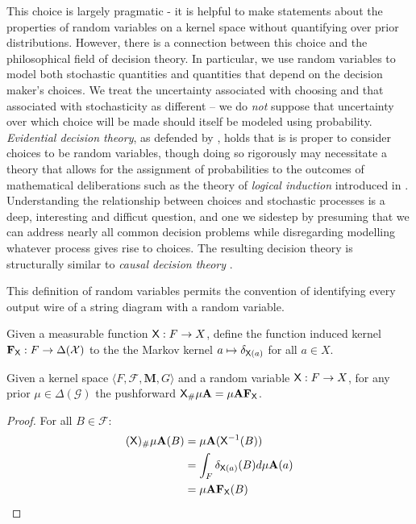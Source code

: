 This choice is largely pragmatic - it is helpful to make statements about the properties of random variables on a kernel space without quantifying over prior distributions. However, there is a connection between this choice and the philosophical field of decision theory. In particular, we use random variables to model both stochastic quantities and quantities that depend on the decision maker's choices. We treat the uncertainty associated with choosing and that associated with stochasticity as different -- we do \emph{not} suppose that uncertainty over which choice will be made should itself be modeled using probability. \emph{Evidential decision theory}, as defended by \citet{jeffrey_logic_1981}, holds that is is proper to consider choices to be random variables, though doing so rigorously may necessitate a theory that allows for the assignment of probabilities to the outcomes of mathematical deliberations such as the theory of \emph{logical induction} introduced in \citet{garrabrant_logical_2017}. Understanding the relationship between choices and stochastic processes is a deep, interesting and difficut question, and one we sidestep by presuming that we can address nearly all common decision problems while disregarding modelling whatever process gives rise to choices. The resulting decision theory is structurally similar to \emph{causal decision theory} \citep{lewis_causal_1981}.

This definition of random variables permits the convention of identifying every output wire of a string diagram with a random variable. 

\begin{definition}
Given a measurable function $\mathsf{X}:F\to X$, define the function induced kernel $\mathbf{F}_{\mathsf{X}}:F\to \Delta(\mathcal{X})$ to the the Markov kernel $a\mapsto \delta_{\mathsf{X}(a)}$ for all $a\in X$.
\end{definition}

\begin{lemma}\label{lem:pushf_funk}
Given a kernel space $\langle F,\mathcal{F},\mathbf{M}, G\rangle$ and a random variable $\mathsf{X}:F\to X$, for any prior $\mu\in \Delta(\mathcal{G})$ the pushforward $\mathsf{X}_\# \mu \mathbf{A} = \mu\mathbf{A} \mathbf{F}_{\mathsf{X}}$.
\end{lemma}

\begin{proof}
For all $B\in \mathcal{F}$:
\begin{align}
  (\mathsf{X})_\# \mu \mathbf{A} (B) &= \mu \mathbf{A} (\mathsf{X}^{-1}(B))\\
  								   &= \int_{F} \delta_{\mathsf{X}(a)} (B) d\mu\mathbf{A} (a)\\
  								   &= \mu\mathbf{A}\mathbf{F}_{\mathsf{X}}(B)
\end{align}
\end{proof}

